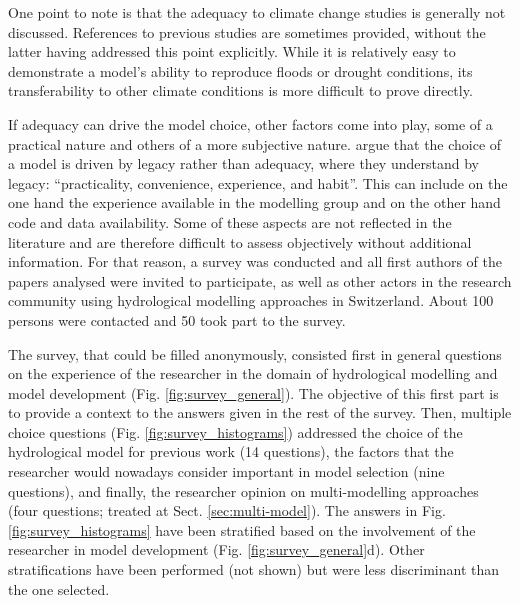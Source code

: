 \documentclass[10pt,a4paper]{article}
\begin{document}
One point to note is that the adequacy to climate change studies is generally not discussed. References to previous studies are sometimes provided, without the latter having addressed this point explicitly. While it is relatively easy to demonstrate a model's ability to reproduce floods or drought conditions, its transferability to other climate conditions is more difficult to prove directly. 

If adequacy can drive the model choice, other factors come into play, some of a practical nature and others of a more subjective nature. \citet{Addor2019} argue that the choice of a model is driven by legacy rather than adequacy, where they understand by legacy: ``practicality, convenience, experience, and habit''. This can include on the one hand the experience available in the modelling group and on the other hand code and data availability. Some of these aspects are not reflected in the literature and are therefore difficult to assess objectively without additional information. For that reason, a survey was conducted and all first authors of the papers analysed were invited to participate, as well as other actors in the research community using hydrological modelling approaches in Switzerland. About 100 persons were contacted and 50 took part to the survey.

The survey, that could be filled anonymously, consisted first in general questions on the experience of the researcher in the domain of hydrological modelling and model development (Fig. \ref{fig:survey_general}). The objective of this first part is to provide a context to the answers given in the rest of the survey. Then, multiple choice questions (Fig. \ref{fig:survey_histograms}) addressed the choice of the hydrological model for previous work (14 questions), the factors that the researcher would nowadays consider important in model selection (nine questions), and finally, the researcher opinion on multi-modelling approaches (four questions; treated at Sect. \ref{sec:multi-model}). The answers in Fig. \ref{fig:survey_histograms} have been stratified based on the involvement of the researcher in model development (Fig. \ref{fig:survey_general}d). Other stratifications have been performed (not shown) but were less discriminant than the one selected.
\end{document}
